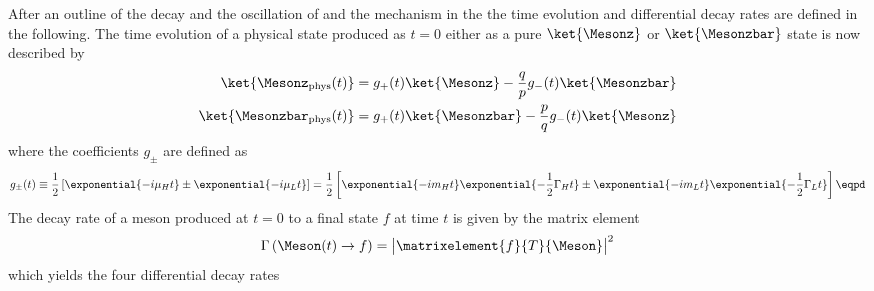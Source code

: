 After an outline of the decay and the oscillation of \Bmesons and the \CKM
mechanism in the \SM the time evolution and differential decay rates are defined
in the following. The time evolution of a physical state produced as $t=0$
either as a pure $\ket{\Mesonz}$ or $\ket{\Mesonzbar}$ state is now described by
%
\begin{equation}
  \begin{split}
    \ket{\Mesonz_{\text{phys}} (t)}    &= g_{+}(t) \ket{\Mesonz}    - \frac{q}{p} g_{-}(t) \ket{\Mesonzbar} \\
    \ket{\Mesonzbar_{\text{phys}} (t)} &= g_{+}(t) \ket{\Mesonzbar} - \frac{p}{q} g_{-}(t) \ket{\Mesonz}
  \end{split}
\end{equation}
%
where the coefficients $g_{\pm}$ are defined as
%
\begin{equation}
  g_{\pm}(t) \equiv 
  \frac{1}{2} \left[
    \exponential{-i \mu_H t} \pm \exponential{-i \mu_L t}
  \right]
  =
  \frac{1}{2} \left[
    \exponential{-i m_H t} \exponential{-\frac{1}{2} \Gamma_H t} \pm \exponential{-i m_L t} \exponential{-\frac{1}{2} \Gamma_L t}
  \right]\eqpd
\end{equation}
%
The decay rate of a meson produced at $t=0$ to a final state $f$ at time $t$
is given by the matrix element
%
\begin{equation}
  \Gamma \left(\Meson(t)\to f\right)= \bigl\vert \matrixelement{f}{T}{\Meson} \bigr\vert^2
\end{equation}
%
which yields the four differential decay rates  
%
